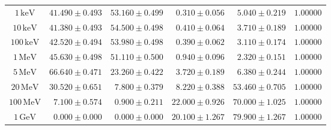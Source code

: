 \begin{tabular}{crrrrr}
\midrule
$1\,\mathrm{keV}$ & $41.490\pm0.493$ & $53.160\pm0.499$ & $0.310\pm0.056$ & $5.040\pm0.219$ & $1.00000$ \\
$10\,\mathrm{keV}$ & $41.380\pm0.493$ & $54.500\pm0.498$ & $0.410\pm0.064$ & $3.710\pm0.189$ & $1.00000$ \\
$100\,\mathrm{keV}$ & $42.520\pm0.494$ & $53.980\pm0.498$ & $0.390\pm0.062$ & $3.110\pm0.174$ & $1.00000$ \\
$1\,\mathrm{MeV}$ & $45.630\pm0.498$ & $51.110\pm0.500$ & $0.940\pm0.096$ & $2.320\pm0.151$ & $1.00000$ \\
$5\,\mathrm{MeV}$ & $66.640\pm0.471$ & $23.260\pm0.422$ & $3.720\pm0.189$ & $6.380\pm0.244$ & $1.00000$ \\
$20\,\mathrm{MeV}$ & $30.520\pm0.651$ & $7.800\pm0.379$ & $8.220\pm0.388$ & $53.460\pm0.705$ & $1.00000$ \\
$100\,\mathrm{MeV}$ & $7.100\pm0.574$ & $0.900\pm0.211$ & $22.000\pm0.926$ & $70.000\pm1.025$ & $1.00000$ \\
$1\,\mathrm{GeV}$ & $0.000\pm0.000$ & $0.000\pm0.000$ & $20.100\pm1.267$ & $79.900\pm1.267$ & $1.00000$ \\
\bottomrule
\end{tabular}
